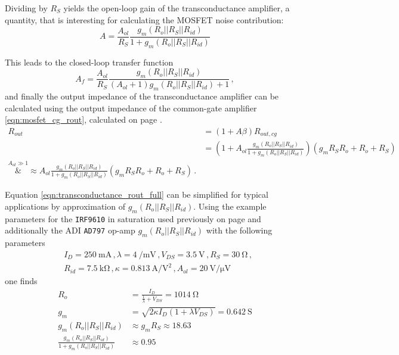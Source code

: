 \documentclass[12pt]{book}
\providecommand{\device}[1]{\texttt{\small #1}}
\begin{document}
Dividing by $R_S$ yields the open-loop gain of the transconductance amplifier, a quantity, that is interesting for calculating the MOSFET noise contribution:
\begin{equation}
    A = \frac{A_{ol}}{R_S} \frac{g_m \left(R_o || R_S || R_{id}\right)}{1 + g_m \left(R_o || R_S || R_{id}\right)} \label{eqn:transconductance_amplifier_open_loop_gain}
\end{equation}

This leads to the closed-loop transfer function
\begin{equation}
    A_f = \frac{A_{ol}}{R_S} \frac{g_m \left(R_o || R_S || R_{id}\right)}{(A_{ol}+1)g_m \left(R_o || R_S || R_{id}\right) + 1} \label{eqn:transconductance_amplifier_transfer_function} \,,
\end{equation}
and finally the output impedance of the transconductance amplifier can be calculated using the output impedance of the common-gate amplifier \ref{eqn:mosfet_cg_rout}, calculated on page \pageref{eqn:mosfet_cg_rout}.
\begin{align}
    R_{out} &= \left(1+ A\beta\right) R_{out,cg} \nonumber\\
    &= \left(1 + A_{ol} \frac{g_m \left(R_o || R_S || R_{id}\right)}{1 + g_m \left(R_o || R_S || R_{id}\right)} \right) \left(g_m R_S R_o + R_o + R_S \right) \nonumber\\
    \overset{A_{ol} \gg 1}&{\approx} A_{ol} \frac{g_m \left(R_o || R_S || R_{id}\right)}{1 + g_m \left(R_o || R_S || R_{id}\right)} \left(g_m R_S R_o + R_o + R_S \right) \,. \label{eqn:transconductance_rout_full}
\end{align}

Equation \ref{eqn:transconductance_rout_full} can be simplified for typical applications by approximation of $g_m \left(R_o || R_S || R_{id}\right)$. Using the example parameters for the \device{IRF9610} in saturation used previously on page \pageref{eqn:mosfet_rout_irf9610} and additionally the ADI \device{AD797} \cite{datasheet_AD797} op-amp $g_m \left(R_o || R_S || R_{id}\right)$ with the following parameters
\begin{align}
    &I_D = \qty{250}{\mA} \,, \lambda = \qty[per-mode=power]{4}{\per \milli \volt} \,, V_{DS} = \qty{3.5}{\V}\,, R_S = \qty{30}{\ohm}\,, \nonumber\\
    &R_{id} = \qty{7.5}{\kilo\ohm}\,, \kappa = \qty[per-mode=power]{0.813}{\ampere \per \square\volt}\,, A_{ol} = \qty[per-mode=power]{20}{\volt \per \uV} \nonumber
\end{align}
one finds
\begin{align}
    R_{o} &= \frac{I_D}{\frac{1}{\lambda} + V_{DS}} = \qty{1014}{\ohm} \nonumber\\
    g_m &= \sqrt{2 \kappa I_D \left(1+ \lambda V_{DS}\right)} = \qty{0.642}{\siemens} \nonumber\\
    g_m \left(R_o || R_S || R_{id}\right) &\approx g_m R_S \approx \num{18.63}\nonumber\\
    \frac{g_m \left(R_o || R_S || R_{id}\right)}{1 + g_m \left(R_o || R_S || R_{id}\right)} &\approx \num{0.95} \nonumber
\end{align}
\end{document}
